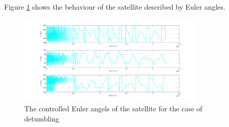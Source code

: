 Figure \ref{fig:ptp_cont} shows the behaviour of the satellite described by Euler angles.
\begin{figure}[H]
    \centering
    \includegraphics[width=0.8\textwidth]{Figures/ptp.png}
    \caption{The controlled Euler angels of the satellite for the case of detumbling}
    \label{fig:ptp_cont}
\end{figure}

\clearpage